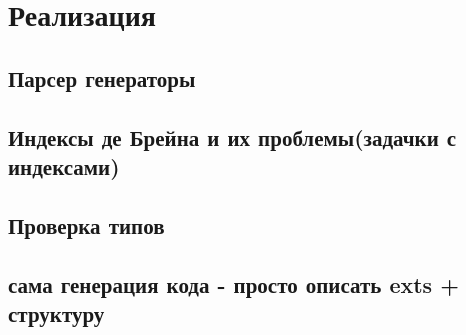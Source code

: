 \section{Реализация}


\subsection{Парсер генераторы}

\subsection{Индексы де Брейна и их проблемы(задачки с индексами)}

\subsection{Проверка типов}

\subsection{сама генерация кода - просто описать exts + структуру}

\subsection{}\label{toposort}
